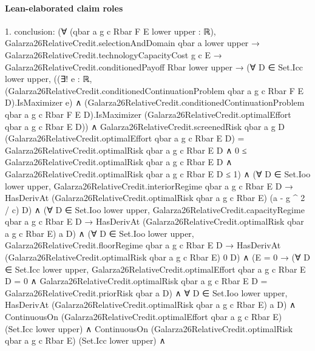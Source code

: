 \documentclass[10pt]{article}
\begin{document}
\paragraph{Lean-elaborated claim roles}\begin{ReviewVerbatim}
1. conclusion: (∀ (qbar a g c Rbar F E lower upper : ℝ),
    Galarza26RelativeCredit.selectionAndDomain qbar a lower upper →
      Galarza26RelativeCredit.technologyCapacityCost g c E →
        Galarza26RelativeCredit.conditionedPayoff Rbar lower upper →
          (∀ D ∈ Set.Icc lower upper,
              ((∃! e : ℝ,
                    (Galarza26RelativeCredit.conditionedContinuationProblem qbar a g c Rbar F E D).IsMaximizer e) ∧
                  (Galarza26RelativeCredit.conditionedContinuationProblem qbar a g c Rbar F E D).IsMaximizer
                    (Galarza26RelativeCredit.optimalEffort qbar a g c Rbar E D)) ∧
                Galarza26RelativeCredit.screenedRisk qbar a g D
                      (Galarza26RelativeCredit.optimalEffort qbar a g c Rbar E D) =
                    Galarza26RelativeCredit.optimalRisk qbar a g c Rbar E D ∧
                  0 ≤ Galarza26RelativeCredit.optimalRisk qbar a g c Rbar E D ∧
                    Galarza26RelativeCredit.optimalRisk qbar a g c Rbar E D ≤ 1) ∧
            (∀ D ∈ Set.Ioo lower upper,
                Galarza26RelativeCredit.interiorRegime qbar a g c Rbar E D →
                  HasDerivAt (Galarza26RelativeCredit.optimalRisk qbar a g c Rbar E) (a - g ^ 2 / c) D) ∧
              (∀ D ∈ Set.Ioo lower upper,
                  Galarza26RelativeCredit.capacityRegime qbar a g c Rbar E D →
                    HasDerivAt (Galarza26RelativeCredit.optimalRisk qbar a g c Rbar E) a D) ∧
                (∀ D ∈ Set.Ioo lower upper,
                    Galarza26RelativeCredit.floorRegime qbar a g c Rbar E D →
                      HasDerivAt (Galarza26RelativeCredit.optimalRisk qbar a g c Rbar E) 0 D) ∧
                  (E = 0 →
                      (∀ D ∈ Set.Icc lower upper,
                          Galarza26RelativeCredit.optimalEffort qbar a g c Rbar E D = 0 ∧
                            Galarza26RelativeCredit.optimalRisk qbar a g c Rbar E D =
                              Galarza26RelativeCredit.priorRisk qbar a D) ∧
                        ∀ D ∈ Set.Ioo lower upper,
                          HasDerivAt (Galarza26RelativeCredit.optimalRisk qbar a g c Rbar E) a D) ∧
                    ContinuousOn (Galarza26RelativeCredit.optimalEffort qbar a g c Rbar E) (Set.Icc lower upper) ∧
                      ContinuousOn (Galarza26RelativeCredit.optimalRisk qbar a g c Rbar E) (Set.Icc lower upper) ∧

\end{ReviewVerbatim}
\end{document}
